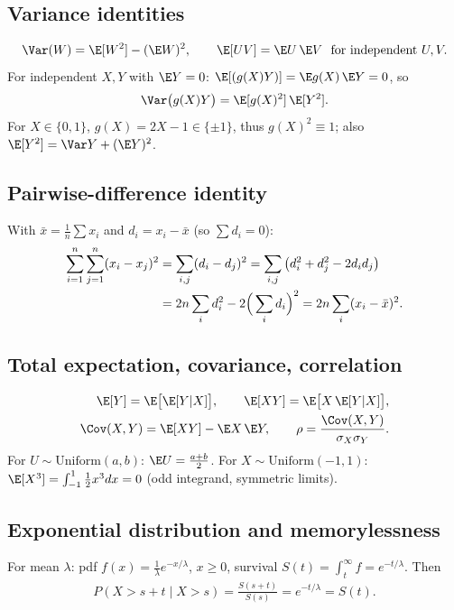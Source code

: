 \subsection{Variance identities}
\begin{align}
\Var(W)=\E[W^2]-(\E W)^2,\qquad
\E[UV]=\E U\,\E V\ \text{ for independent }U,V. \label{eq:var}
\end{align}
For independent $X,Y$ with $\E Y=0$: $\E[(g(X)Y)]=\E g(X)\,\E Y=0$, so
\begin{align}
\Var\big(g(X)Y\big)=\E[g(X)^2]\,\E[Y^2]. \label{eq:varprod}
\end{align}
For $X\in\{0,1\}$, $g(X)=2X-1\in\{\pm1\}$, thus $g(X)^2\equiv1$; also $\E[Y^2]=\Var Y+(\E Y)^2$.

\subsection{Pairwise-difference identity}
With $\bar x=\frac1n\sum x_i$ and $d_i=x_i-\bar x$ (so $\sum d_i=0$):
\begin{align}
\sum_{i=1}^n\sum_{j=1}^n(x_i-x_j)^2&=\sum_{i,j}(d_i-d_j)^2
=\sum_{i,j}\big(d_i^2+d_j^2-2d_id_j\big)\notag\\
&=2n\sum_id_i^2-2\Big(\sum_id_i\Big)^2=2n\sum_i(x_i-\bar x)^2. \label{eq:pairdiff}
\end{align}

\subsection{Total expectation, covariance, correlation}
\begin{align}
\E[Y]=\E\big[\E[Y|X]\big],\qquad \E[XY]=\E\big[X\,\E[Y|X]\big], \label{eq:totalexp}\\
\Cov(X,Y)=\E[XY]-\E X\,\E Y,\qquad \rho=\frac{\Cov(X,Y)}{\sigma_X\sigma_Y}. \label{eq:corr}
\end{align}
For $U\sim\text{Uniform}(a,b)$: $\E U=\frac{a+b}2$. For $X\sim\text{Uniform}(-1,1)$:
$\E[X^3]=\int_{-1}^1\tfrac12x^3dx=0$ (odd integrand, symmetric limits).

\subsection{Exponential distribution and memorylessness}
For mean $\lambda$: pdf $f(x)=\frac1\lambda e^{-x/\lambda}$, $x\ge0$, survival
$S(t)=\int_t^\infty f=e^{-t/\lambda}$. Then
\begin{align}
P(X>s+t\mid X>s)=\frac{S(s+t)}{S(s)}=e^{-t/\lambda}=S(t). \label{eq:memoryless}
\end{align}

